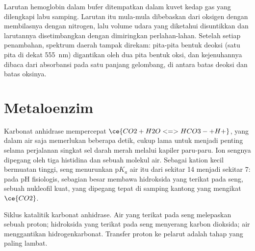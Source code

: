 \begin{inthelab}
Larutan hemoglobin dalam bufer ditempatkan dalam kuvet kedap gas yang dilengkapi
labu samping. Larutan itu mula-mula dibebaskan dari oksigen dengan membilasnya dengan nitrogen, lalu
volume udara yang diketahui disuntikkan dan larutannya disetimbangkan dengan dimiringkan
perlahan-lahan. Setelah setiap penambahan, spektrum daerah tampak direkam: pita-pita
bentuk deoksi (satu pita di dekat \qty{555}{nm}) digantikan oleh dua pita bentuk oksi,
dan kejenuhannya dibaca dari absorbansi pada satu panjang gelombang, di antara batas
deoksi dan batas oksinya.
\end{inthelab}

\section{Metaloenzim}

Karbonat anhidrase mempercepat $\ce{CO2 + H2O <=> HCO3- + H+}$, yang dalam air saja memerlukan
beberapa detik, cukup lama untuk menjadi penting selama perjalanan singkat sel darah merah melalui kapiler
paru-paru. Ion sengnya dipegang oleh tiga histidina dan sebuah molekul air. Sebagai
kation kecil bermuatan tinggi, seng menurunkan $\mathrm pK_a$ air itu dari sekitar 14 menjadi
sekitar 7: pada pH fisiologis, sebagian besar  membawa hidroksida yang terikat pada seng,
sebuah nukleofil kuat, yang dipegang tepat di samping kantong yang mengikat $\ce{CO2}$.

\begin{omfigure}

{\small Siklus katalitik karbonat anhidrase. Air yang terikat pada seng melepaskan sebuah
proton; hidroksida yang terikat pada seng menyerang karbon dioksida; air menggantikan
hidrogenkarbonat. Transfer proton ke pelarut adalah tahap yang paling lambat.}
\end{omfigure}

